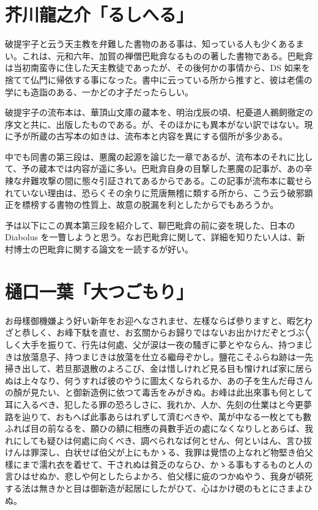 \documentclass{utarticle}
\begin{document}
\section{芥川龍之介「るしへる」}

破提宇子と云う天主教を弁難した書物のある事は、知っている人も少くあるまい。これは、元和六年、加賀の禅僧巴毗弇なるものの著した書物である。巴毗弇は当初南蛮寺に住した天主教徒であったが、その後何かの事情から、DS 如来を捨てて仏門に帰依する事になった。書中に云っている所から推すと、彼は老儒の学にも造詣のある、一かどの才子だったらしい。

破提宇子の流布本は、華頂山文庫の蔵本を、明治戊辰の頃、杞憂道人鵜飼徹定の序文と共に、出版したものである。が、そのほかにも異本がない訳ではない。現に予が所蔵の古写本の如きは、流布本と内容を異にする個所が多少ある。

中でも同書の第三段は、悪魔の起源を論じた一章であるが、流布本のそれに比して、予の蔵本では内容が遥に多い。巴毗弇自身の目撃した悪魔の記事が、あの辛辣な弁難攻撃の間に態々引証されてあるからである。この記事が流布本に載せられていない理由は、恐らくその余りに荒唐無稽に類する所から、こう云う破邪顕正を標榜する書物の性質上、故意の脱漏を利としたからでもあろうか。

予は以下にこの異本第三段を紹介して、聊巴毗弇の前に姿を現した、日本の Diabolus を一瞥しようと思う。なお巴毗弇に関して、詳細を知りたい人は、新村博士の巴毗弇に関する論文を一読するが好い。


\section{樋口一葉「大つごもり」}

お母樣御機嫌よう好い新年をお迎へなされませ、左樣ならば參りますと、暇乞わざと恭しく、お峰下駄を直せ、お玄關からお歸りではないお出かけだぞとづぶ〳〵しく大手を振りて、行先は何處、父が涙は一夜の騷ぎに夢とやならん、持つまじきは放蕩息子、持つまじきは放蕩を仕立る繼母ぞかし。鹽花こそふらね跡は一先掃き出して、若旦那退散のよろこび、金は惜しけれど見る目も憎ければ家に居らぬは上々なり、何うすれば彼のやうに圖太くなられるか、あの子を生んだ母さんの顏が見たい、と御新造例に依つて毒舌をみがきぬ。お峰は此出來事も何として耳に入るべき、犯したる罪の恐ろしさに、我れか、人か、先刻の仕業はと今更夢路を辿りて、おもへば此事あらはれずして濟むべきや、萬が中なる一枚とても數ふれば目の前なるを、願ひの額に相應の員數手近の處になくなりしとあらば、我れにしても疑ひは何處に向くべき、調べられなば何とせん、何といはん、言ひ拔けんは罪深し、白状せば伯父が上にもかゝる、我罪は覺悟の上なれど物堅き伯父樣にまで濡れ衣を着せて、干されぬは貧乏のならひ、かゝる事もするものと人の言ひはせぬか、悲しや何としたらよかろ、伯父樣に疵のつかぬやう、我身が頓死する法は無きかと目は御新造が起居にしたがひて、心はかけ硯のもとにさまよひぬ。
\end{document}
